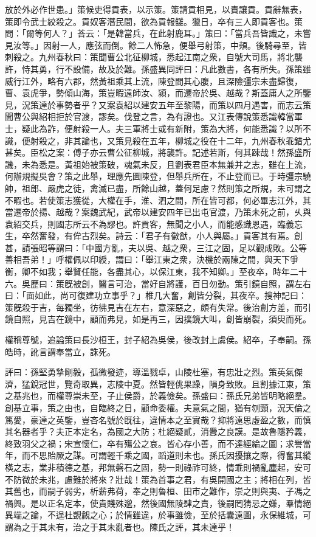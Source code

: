\begin{pinyinscope}
放於外必作世患。」策候吏得貢表，以示策。策請貢相見，以責讓貢。貢辭無表，策即令武士絞殺之。貢奴客潛民間，欲為貢報讎。獵日，卒有三人即貢客也。策問：「爾等何人？」荅云：「是韓當兵，在此射鹿耳。」策曰：「當兵吾皆識之，未嘗見汝等。」因射一人，應弦而倒。餘二人怖急，便舉弓射策，中頰。後騎尋至，皆刺殺之。九州春秋曰：策聞曹公北征柳城，悉起江南之衆，自號大司馬，將北襲許，恃其勇，行不設備，故及於難。孫盛異同評曰：凡此數書，各有所失。孫策雖威行江外，略有六郡，然黃祖乘其上流，陳登間其心腹，且深險彊宗未盡歸復，曹、袁虎爭，勢傾山海，策豈暇遠師汝、潁，而遷帝於吳、越哉？斯蓋庸人之所鑒見，況策達於事勢者乎？又案袁紹以建安五年至黎陽，而策以四月遇害，而志云策聞曹公與紹相拒於官渡，謬矣。伐登之言，為有證也。又江表傳說策悉識韓當軍士，疑此為詐，便射殺一人。夫三軍將士或有新附，策為大將，何能悉識？以所不識，便射殺之，非其論也，又策見殺在五年，柳城之役在十二年，九州春秋乖錯尤甚矣。臣松之案：傅子亦云曹公征柳城，將襲許。記述若斯，何其踈哉！然孫盛所譏，未為悉是。黃祖始被策破，魂氣未反，且劉表君臣本無兼并之志，雖在上流，何辦規擬吳會？策之此舉，理應先圖陳登，但舉兵所在，不止登而已。于時彊宗驍帥，祖郎、嚴虎之徒，禽滅已盡，所餘山越，蓋何足慮？然則策之所規，未可謂之不暇也。若使策志獲從，大權在手，淮、泗之間，所在皆可都，何必畢志江外，其當遷帝於揚、越哉？案魏武紀，武帝以建安四年已出屯官渡，乃策未死之前，乆與袁紹交兵，則國志所云不為謬也。許貢客，無聞之小人，而能感識恩遇，臨義忘生，卒然奮發，有侔古烈矣。詩云：「君子有徽猷，小人與屬。」貢客其有焉。創甚，請張昭等謂曰：「中國方亂，夫以吳、越之衆，三江之固，足以觀成敗。公等善相吾弟！」呼權佩以印綬，謂曰：「舉江東之衆，決機於兩陳之間，與天下爭衡，卿不如我；舉賢任能，各盡其心，以保江東，我不知卿。」至夜卒，時年二十六。吳歷曰：策旣被創，醫言可治，當好自將護，百日勿動。策引鏡自照，謂左右曰：「面如此，尚可復建功立事乎？」椎几大奮，創皆分裂，其夜卒。搜神記曰：策旣殺于吉，每獨坐，彷彿見吉在左右，意深惡之，頗有失常。後治創方差，而引鏡自照，見吉在鏡中，顧而弗見，如是再三，因撲鏡大叫，創皆崩裂，須臾而死。

權稱尊號，追謚策曰長沙桓王，封子紹為吳侯，後改封上虞侯。紹卒，子奉嗣。孫皓時，訛言謂奉當立，誅死。

評曰：孫堅勇摯剛毅，孤微發迹，導溫戮卓，山陵杜塞，有忠壯之烈。策英氣傑濟，猛銳冠世，覽奇取異，志陵中夏。然皆輕佻果躁，隕身致敗。且割據江東，策之基兆也，而權尊崇未至，子止侯爵，於義儉矣。孫盛曰：孫氏兄弟皆明略絕羣。創基立事，策之由也，自臨終之日，顧命委權。夫意氣之間，猶有刎頸，況天倫之篤愛，豪達之英鑒，豈吝名號於旣往，違情本之至實哉？抑將遠思虛盈之數，而慎其名器者乎？夫正本定名，為國之大防；杜絕疑貳，消釁之良謨。是故魯隱矜義，終致羽父之禍；宋宣懷仁，卒有殤公之哀。皆心存小善，而不達經綸之圖；求譽當年，而不思貽厥之謀。可謂輕千乘之國，蹈道則未也。孫氏因擾攘之際，得奮其縱橫之志，業非積德之基，邦無磐石之固，勢一則祿祚可終，情乖則禍亂塵起，安可不防微於未兆，慮難於將來？壯哉！策為首事之君，有吳開國之主；將相在列，皆其舊也，而嗣子弱劣，析薪弗荷，奉之則魯桓、田巿之難作，崇之則與夷、子馮之禍興。是以正名定本，使貴賤殊邈，然後國無陵肆之責，後嗣罔猜忌之嫌，羣情絕異端之論，不逞杜覬覦之心；於情雖違，於事雖儉，至於括囊遠圖，永保維城，可謂為之于其未有，治之于其未亂者也。陳氏之評，其未達乎！


\end{pinyinscope}